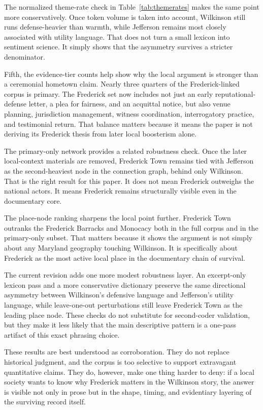 

The normalized theme-rate check in Table~\ref{tab:themerates} makes the same point more conservatively. Once token volume is taken into account, Wilkinson still runs defense-heavier than warmth, while Jefferson remains most closely associated with utility language. That does not turn a small lexicon into sentiment science. It simply shows that the asymmetry survives a stricter denominator.

Fifth, the evidence-tier counts help show why the local argument is stronger than a ceremonial hometown claim. Nearly three quarters of the Frederick-linked corpus is primary. The Frederick set now includes not just an early reputational-defense letter, a plea for fairness, and an acquittal notice, but also venue planning, jurisdiction management, witness coordination, interrogatory practice, and testimonial return. That balance matters because it means the paper is not deriving its Frederick thesis from later local boosterism alone.




The primary-only network provides a related robustness check. Once the later local-context materials are removed, Frederick Town remains tied with Jefferson as the second-heaviest node in the connection graph, behind only Wilkinson. That is the right result for this paper. It does not mean Frederick outweighs the national actors. It means Frederick remains structurally visible even in the documentary core.

The place-node ranking sharpens the local point further. Frederick Town outranks the Frederick Barracks and Monocacy both in the full corpus and in the primary-only subset. That matters because it shows the argument is not simply about any Maryland geography touching Wilkinson. It is specifically about Frederick as the most active local place in the documentary chain of survival.

The current revision adds one more modest robustness layer. An excerpt-only lexicon pass and a more conservative dictionary preserve the same directional asymmetry between Wilkinson's defensive language and Jefferson's utility language, while leave-one-out perturbations still leave Frederick Town as the leading place node. These checks do not substitute for second-coder validation, but they make it less likely that the main descriptive pattern is a one-pass artifact of this exact phrasing choice.

These results are best understood as corroboration. They do not replace historical judgment, and the corpus is too selective to support extravagant quantitative claims. They do, however, make one thing harder to deny: if a local society wants to know why Frederick matters in the Wilkinson story, the answer is visible not only in prose but in the shape, timing, and evidentiary layering of the surviving record itself.
